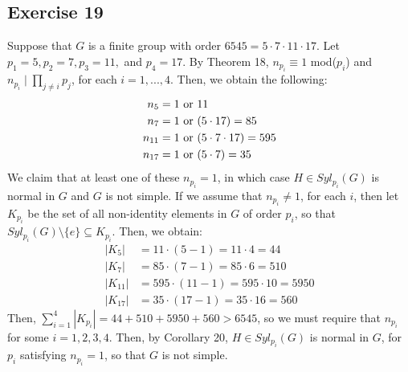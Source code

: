 \subsection*{Exercise 19}
Suppose that $G$ is a finite group with order $6545 = 5\cdot7\cdot11\cdot17$. Let $p_1 = 5, p_2 = 7, p_3 = 11,$ and $p_4 = 17$. By Theorem 18, $n_{p_i} \equiv 1$ mod($p_i$) and $n_{p_i} \mid \prod_{j\not=i}p_j$, for each $i = 1,...,4$. Then, we obtain the following: \begin{align*}
    n_5 &= 1 \textnormal{ or } 11 \\
    n_7 &= 1 \textnormal{ or } (5\cdot17)=85 \\
    n_{11} &= 1 \textnormal{ or } (5\cdot7\cdot17)=595 \\
    n_{17} &= 1 \textnormal{ or } (5\cdot7)=35
\end{align*}
We claim that at least one of these $n_{p_i} = 1$, in which case $H \in Syl_{p_i}(G)$ is normal in $G$ and $G$ is not simple. If we assume that $n_{p_i} \not= 1$, for each $i$, then let $K_{p_i}$ be the set of all non-identity elements in $G$ of order $p_i$, so that $Syl_{p_i}(G) \setminus \{e\} \subseteq K_{p_i}$. Then, we obtain:
\begin{align*}
    |K_5| &= 11\cdot(5-1) = 11\cdot4 = 44 \\
    |K_7| &= 85\cdot(7-1) = 85\cdot6 = 510 \\
    |K_{11}| &= 595\cdot(11-1) = 595\cdot10 = 5950 \\
    |K_{17}| &= 35\cdot(17-1) = 35\cdot16 = 560
\end{align*}
Then, $\sum_{i=1}^4|K_{p_i}| = 44+510+5950+560>6545$, so we must require that $n_{p_i}$ for some $i = 1,2,3,4$. Then, by Corollary 20, $H \in Syl_{p_i}(G)$ is normal in $G$, for $p_i$ satisfying $n_{p_i} = 1$, so that $G$ is not simple.